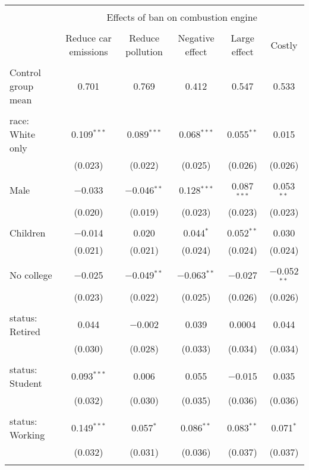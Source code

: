 
\begin{tabular}{@{\extracolsep{5pt}}lccccc} 
\\[-1.8ex]\hline 
\hline \\[-1.8ex] 
 & \multicolumn{5}{c}{Effects of ban on combustion engine} \\ 
\cline{2-6} 
\\[-1.8ex] & Reduce car emissions & Reduce pollution & Negative effect & Large effect & Costly \\ 
\hline \\[-1.8ex] 
 Control group mean & 0.701 & 0.769 & 0.412 & 0.547 & 0.533  \\ \hline \\[-1.8ex] race: White only & 0.109$^{***}$ & 0.089$^{***}$ & 0.068$^{***}$ & 0.055$^{**}$ & 0.015 \\ 
  & (0.023) & (0.022) & (0.025) & (0.026) & (0.026) \\ 
  & & & & & \\ 
 Male & $-$0.033 & $-$0.046$^{**}$ & 0.128$^{***}$ & 0.087$^{***}$ & 0.053$^{**}$ \\ 
  & (0.020) & (0.019) & (0.023) & (0.023) & (0.023) \\ 
  & & & & & \\ 
 Children & $-$0.014 & 0.020 & 0.044$^{*}$ & 0.052$^{**}$ & 0.030 \\ 
  & (0.021) & (0.021) & (0.024) & (0.024) & (0.024) \\ 
  & & & & & \\ 
 No college & $-$0.025 & $-$0.049$^{**}$ & $-$0.063$^{**}$ & $-$0.027 & $-$0.052$^{**}$ \\ 
  & (0.023) & (0.022) & (0.025) & (0.026) & (0.026) \\ 
  & & & & & \\ 
 status: Retired & 0.044 & $-$0.002 & 0.039 & 0.0004 & 0.044 \\ 
  & (0.030) & (0.028) & (0.033) & (0.034) & (0.034) \\ 
  & & & & & \\ 
 status: Student & 0.093$^{***}$ & 0.006 & 0.055 & $-$0.015 & 0.035 \\ 
  & (0.032) & (0.030) & (0.035) & (0.036) & (0.036) \\ 
  & & & & & \\ 
 status: Working & 0.149$^{***}$ & 0.057$^{*}$ & 0.086$^{**}$ & 0.083$^{**}$ & 0.071$^{*}$ \\ 
  & (0.032) & (0.031) & (0.036) & (0.037) & (0.037) \\ 
  & & & & & \\ 

\end{tabular}
